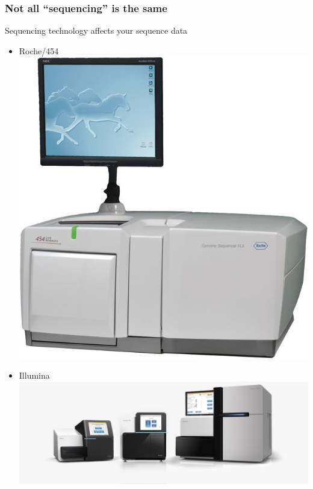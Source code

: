 \begin{frame}
  \frametitle{Not all ``sequencing'' is the same}
  Sequencing technology affects your sequence data
  \begin{itemize}
    \item Roche/454 \includegraphics[height=0.15\textheight]{images/454_sequencer}
    \item Illumina \includegraphics[height=0.15\textheight]{images/miseq_nextseq_hiseq}

\end{itemize}
\end{frame}
